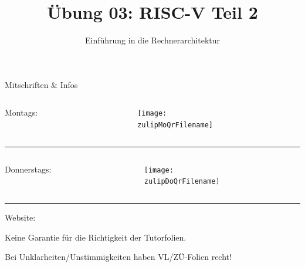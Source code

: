 \documentclass[
  german,            %
  aspectratio=169,    %
]{tumbeamer}
\title{Übung 03: RISC-V Teil 2}
\subtitle{Einführung in die Rechnerarchitektur}
\author{\theAuthorName}
\institute{\theGroupName\\\theSchoolName\\\theUniversityName}
\date{\DTMdisplaydate{2024}{11}{04}{-1}}
\begin{document}
\maketitle

\begin{frame}[c]{Mitschriften \& Infos}{}
  \begin{minipage}[t]{\textwidth}
    \begin{columns}[c]
      \begin{column}{0.8\textwidth}
        Montags: \href{\zulipMo}{\zulipMo}
      \end{column}
      \begin{column}{0.2\textwidth}
        \texttt{[image: \\zulipMoQrFilename]}
      \end{column}
    \end{columns}
  \end{minipage}
  \rule{\textwidth}{0.4pt}
  \begin{minipage}[t]{\textwidth}
    \begin{columns}[c]
      \begin{column}{0.8\textwidth}
        Donnerstags: \href{\zulipDo}{\zulipDo}
      \end{column}
      \begin{column}{0.2\textwidth}
        \texttt{[image: \\zulipDoQrFilename]}
      \end{column}
    \end{columns}
  \end{minipage}
  \ifdefined\myWebsite
  \rule{\textwidth}{0.4pt}
  \centering
  Website: \href{\myWebsite}{\myWebsite}
  \fi
\end{frame}

\begin{frame}[c]{}{}
  \begin{center}
    \LARGE  Keine Garantie für die Richtigkeit der Tutorfolien.

    \Large Bei Unklarheiten/Unstimmigkeiten haben VL/ZÜ-Folien recht!
  \end{center}
\end{frame}
\end{document}

